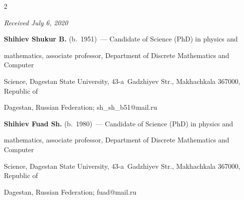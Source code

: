 \begin{multicols}{2}
{{



 }

 }



\end{multicols}



\vspace*{-6pt}



\hfill{\small\textit{Received July 6, 2020}}









\Contr



\noindent

\textbf{Shihiev Shukur B.} (b.\ 1951)~--- Candidate of Science (PhD) in physics and 

mathematics, associate professor, Department of Discrete Mathematics and Computer 

Science, Dagestan State University, 43-a~Gadzhiyev Str., Makhachkala 367000, Republic of 

Dagestan, Russian Federation; \mbox{sh\_sh\_b51@mail.ru}



\vspace*{3pt}



\noindent

\textbf{Shihiev Fuad Sh.} (b.\ 1980)~--- Candidate of Science (PhD) in physics and 

mathematics, associate professor, Department of Discrete Mathematics and Computer 

Science, Dagestan State University, 43-a~Gadzhiyev Str., Makhachkala 367000, Republic of 

Dagestan, Russian Federation; \mbox{fuad@mail.ru}







\label{end\stat}



\renewcommand{\bibname}{\protect\rm Литература} 

